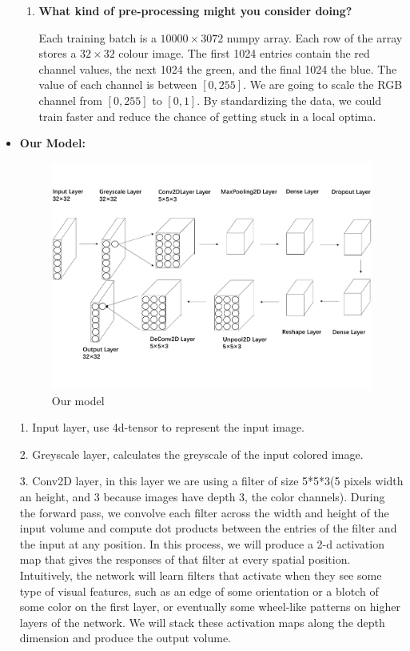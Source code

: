 \documentclass[letter]{article}
\begin{document}
\begin{itemize}
\begin{enumerate}
		\item {\textbf{What kind of pre-processing might you consider doing?}}
		\par{Each training batch is a $ 10000\times3072 $ numpy array. Each row of the array stores a $ 32\times32 $ colour image. The first 1024 entries contain the red channel values, the next 1024 the green, and the final 1024 the blue. The value of each channel is between $ [0, 255] $. We are going to scale the RGB channel from $ [0, 255] $ to $ [0, 1] $. By standardizing the data, we could train faster and reduce the chance of getting stuck in a local optima.}
	\end{enumerate}
	\item {\textbf{Our Model:}} 
	\begin{figure}[H]
		\centering
		\includegraphics[width=.8\textwidth]{figs/structure.pdf}
		\caption{Our model}
	\end{figure}
	\par{1.	Input layer, use 4d-tensor to represent the input image.
	}\par{2.	Greyscale layer, calculates the greyscale of the input colored image.
	}\par{3.	Conv2D layer, in this layer we are using a filter of size 5*5*3(5 pixels width an height, and 3 because images have depth 3, the color channels). During the forward pass, we convolve each filter across the width and height of the input volume and compute dot products between the entries of the filter and the input at any position. In this process, we will produce a 2-d activation map that gives the responses of that filter at every spatial position. Intuitively, the network will learn filters that activate when they see some type of visual features, such as an edge of some orientation or a blotch of some color on the first layer, or eventually some wheel-like patterns on higher layers of the network. We will stack these activation maps along the depth dimension and produce the output volume.
}
\end{itemize}
\end{document}
